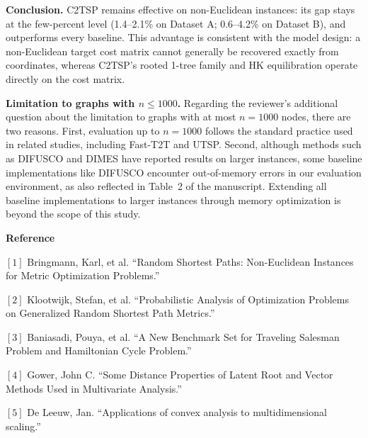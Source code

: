 \textbf{Conclusion.} C2TSP remains effective on non-Euclidean instances: its gap stays at the few-percent level (1.4--2.1\% on Dataset A; 0.6--4.2\% on Dataset B), and outperforms every baseline. This advantage is consistent with the model design: a non-Euclidean target cost matrix cannot generally be recovered exactly from coordinates, whereas C2TSP's rooted 1-tree family and HK equilibration operate directly on the cost matrix.

\textbf{Limitation to graphs with $n\le1000$.}  Regarding the reviewer's additional question about the limitation to graphs with at most $n=1000$ nodes, there are two reasons. First, evaluation up to $n=1000$ follows the standard practice used in related studies, including Fast-T2T and UTSP. Second, although methods such as DIFUSCO and DIMES have reported results on larger instances, some baseline implementations like DIFUSCO encounter out-of-memory errors in our evaluation environment, as also reflected in Table~2 of the manuscript. Extending all baseline implementations to larger instances through memory optimization is beyond the scope of this study.

\textbf{Reference}

$[1]$ Bringmann, Karl, et al. ``Random Shortest Paths: Non-Euclidean Instances for Metric Optimization Problems.''

$[2]$ Klootwijk, Stefan, et al. ``Probabilistic Analysis of Optimization Problems on Generalized Random Shortest Path Metrics.''

$[3]$ Baniasadi, Pouya, et al. ``A New Benchmark Set for Traveling Salesman Problem and Hamiltonian Cycle Problem.''

$[4]$ Gower, John C. ``Some Distance Properties of Latent Root and Vector Methods Used in Multivariate Analysis.''

$[5]$ De Leeuw, Jan. ``Applications of convex analysis to multidimensional scaling.''